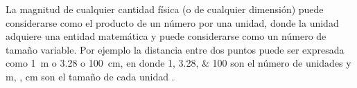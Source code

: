 \documentclass[master.tex]{subfiles}
\begin{document}
    La magnitud de cualquier cantidad física (o de cualquier dimensión) puede considerarse como el producto de un número por una unidad, donde la unidad adquiere una entidad matemática y puede considerarse como un número de tamaño variable. Por ejemplo la distancia entre dos puntos puede ser expresada como \qty{1}{\metre} o \qty{3.28}{\feet} o \qty{100}{\centi\metre}, en donde \numlist{1;3.28;100} son el número de unidades y \unit{m}, \unit{\feet}, \unit{\centi\metre} son el tamaño de cada unidad \parencite{coulson1}.

     

\printbibliography[title=Bibliografía del capítulo]
    
\end{document}
